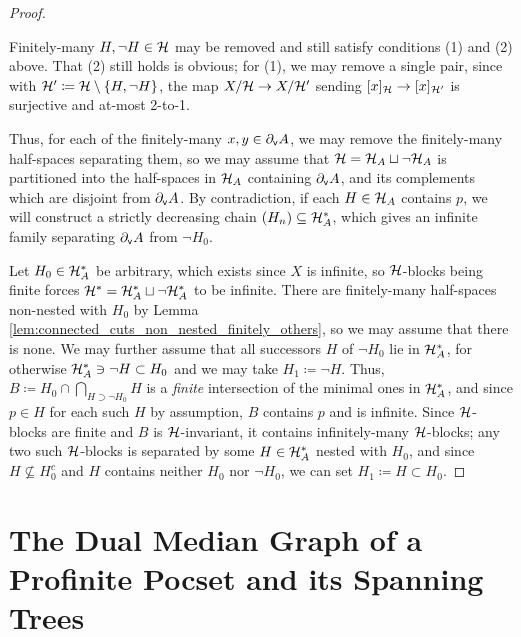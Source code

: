 \documentclass[reqno]{amsart}
\begin{document}
\begin{proof}
\begin{center}
\begin{minipage}{0.95\textwidth}
                \begin{observation*}
                    Finitely-many $H,\lnot H\in\mathcal{H}$ may be removed and still satisfy conditions (1) and (2) above. That (2) still holds is obvious; for (1), we may remove a single pair, since with $\mathcal{H}'\coloneqq\mathcal{H}\setminus\left\{H,\lnot H\right\}$, the map $X/\mathcal{H}\to X/\mathcal{H}'$ sending $[x]_{\mathcal{H}}\to[x]_{\mathcal{H}'}$ is surjective and at-most 2-to-1.
            \end{observation*}
            \end{minipage}
        \end{center}
        Thus, for each of the finitely-many $x,y\in\partial_\mathsf{v}A$, we may remove the finitely-many half-spaces separating them, so we may assume that $\mathcal{H}=\mathcal{H}_A\sqcup\lnot\mathcal{H}_A$ is partitioned into the half-spaces in $\mathcal{H}_A$ containing $\partial_\mathsf{v}A$, and its complements which are disjoint from $\partial_\mathsf{v}A$. By contradiction, if each $H\in\mathcal{H}_A$ contains $p$, we will construct a strictly decreasing chain $(H_n)\subseteq\mathcal{H}_A^\ast$, which gives an infinite family separating $\partial_\mathsf{v}A$ from $\lnot H_0$.

        Let $H_0\in\mathcal{H}_A^\ast$ be arbitrary, which exists since $X$ is infinite, so $\mathcal{H}$-blocks being finite forces $\mathcal{H}^\ast=\mathcal{H}_A^\ast\sqcup\lnot\mathcal{H}_A^\ast$ to be infinite. There are finitely-many half-spaces non-nested with $H_0$ by Lemma \ref{lem:connected_cuts_non_nested_finitely_others}, so we may assume that there is none. We may further assume that all successors $H$ of $\lnot H_0$ lie in $\mathcal{H}_A^\ast$, for otherwise $\mathcal{H}_A^\ast\ni\lnot H\subset H_0$ and we may take $H_1\coloneqq\lnot H$. Thus, $B\coloneqq H_0\cap\bigcap_{H\supset\lnot H_0}H$ is a \textit{finite} intersection of the minimal ones in $\mathcal{H}_A^\ast$, and since $p\in H$ for each such $H$ by assumption, $B$ contains $p$ and is infinite. Since $\mathcal{H}$-blocks are finite and $B$ is $\mathcal{H}$-invariant, it contains infinitely-many $\mathcal{H}$-blocks; any two such $\mathcal{H}$-blocks is separated by some $H\in\mathcal{H}_A^\ast$ nested with $H_0$, and since $H\not\subseteq H_0^c$ and $H$ contains neither $H_0$ nor $\lnot H_0$, we can set $H_1\coloneqq H\subset H_0$.
    \end{proof}

    \section{The Dual Median Graph of a Profinite Pocset and its Spanning Trees}
\end{document}
